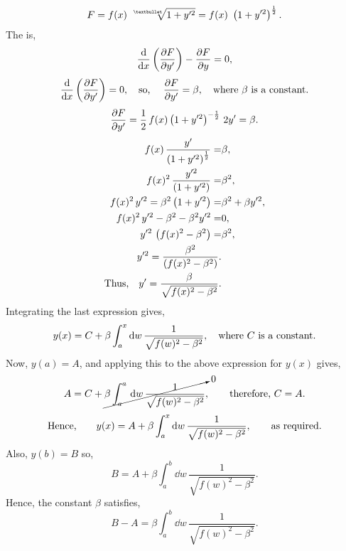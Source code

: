 \def\yp{y^{\prime}}
\vspace{-6mm}
\begin{equation*}
	F=f(x)\,\,\sqrt[•]{1+y^{\prime2}} = f(x)\,\,\lr{1 + y^{\prime2}}^\half.
\end{equation*}
The \el is,
\[
	\ELE{F}{x}{y},
\]
\[
	\deriv{}{x}\lr{\pderiv{F}{y^\prime}} = 0,\quad\textrm{so, }\quad\pderiv{F}{y^\prime} = \beta,\quad \textrm{where } \beta \textrm{ is a constant.}
\]
\[
	\pderiv{F}{y^\prime} =\half\, f(x) \lr{ 1+y^{\prime2}}^{-\half}\,2y^\prime = \beta.
\]
\begin{align*}
	f(x) \,   \frac{y^\prime}{\lr{1 + y^{\prime2}}^\half} =&\beta,\\
	f(x)^2 \, \frac{y^{\prime2}}{\lr{1 + y^{\prime2}}} =& \beta^2,\\
	f(x)^2 \,y^{\prime2} = \beta^2\lr{1 + y^{\prime2}} =& \beta^2 + \beta y^{\prime2},\\
	f(x)^2 \,y^{\prime2} - \beta^2 - \beta^2 y^{\prime2} =& 0,\\
	y^{\prime2} \,\lr{f(x)^2 - \beta^2 } =& \beta^2,\\
	y^{\prime2}  = \frac{\beta^2}{\lr{f(x)^2 - \beta^2 }}.\\
	\textrm{Thus,}\quad y^{\prime}  = \frac{\beta}{\sqrt{f(x)^2 - \beta^2 }}.
\end{align*}
Integrating the last expression gives,
\[
	y(x) = C + \beta \Int{a}{x}{w}\frac{1}{\sqrt{f(w)^2 - \beta^2 }},\quad\textrm{where $C$ is a constant.}
\]
Now, $y(a) = A$, and applying this to the above expression for $y(x)$ gives,
\[
	A = C + \cancelto{0}{\beta\int_a^a\dd w\, \frac{1}{\sqrt{f(w)^2 -\beta^2}}},\qquad\textrm{therefore, } C=A.
\]
\[
	\textrm{Hence,}\qquad y(x) = A + \beta \Int{a}{x}{w}\frac{1}{\sqrt{f(w)^2 - \beta^2 }},\qquad\textrm{as required.}
\]
Also, $y(b) = B$ so,
\[
	B = A + \beta\int_a^b\dd w\, \frac{1}{\sqrt{f(w)^2 -\beta^2}}.
\]
Hence, the constant $\beta$ satisfies,
\[
	B - A = \beta \int_a^b\dd w\, \frac{1}{\sqrt{f(w)^2 -\beta^2}}.
\]